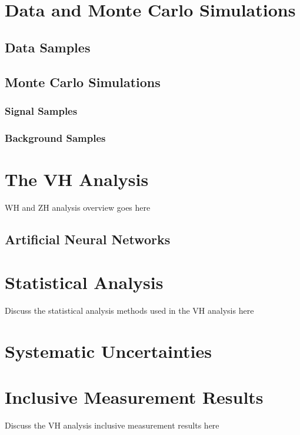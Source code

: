 \documentclass{umassthesis}          %
\begin{document}
\chapter{Data and Monte Carlo Simulations}\label{ch:data_mc}
\section{Data Samples}\label{sec:data_samples}

\section{Monte Carlo Simulations}\label{sec:mc_simulations}
\subsection{Signal Samples}\label{sec:signal_samples}

\subsection{Background Samples}\label{sec:background_samples}


\chapter{The VH Analysis}\label{ch:vh_analysis}
WH and ZH analysis overview goes here
\section{Artificial Neural Networks}\label{sec:nn}

\chapter{Statistical Analysis}\label{ch:statistical_analysis}
Discuss the statistical analysis methods used in the VH analysis here

\chapter{Systematic Uncertainties}\label{ch:systematics}

\chapter{Inclusive Measurement Results}\label{ch:vh_inclusive_results}
Discuss the VH analysis inclusive measurement results here
\end{document}
